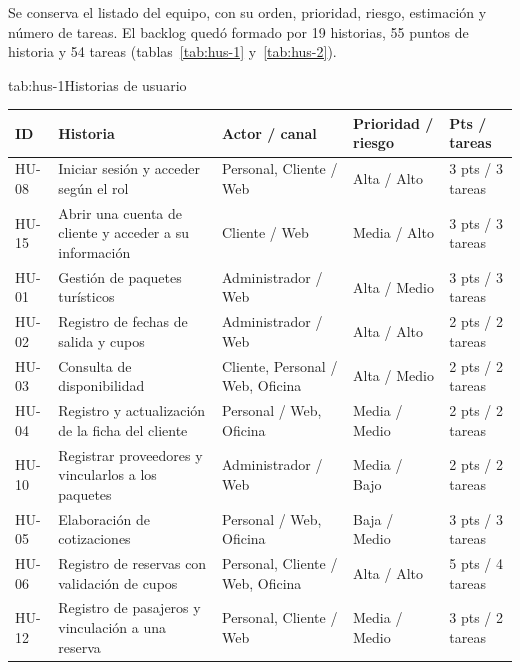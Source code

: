 Se conserva el listado del equipo, con su orden, prioridad, riesgo,
estimación y número de tareas. El backlog quedó formado por 19 historias,
55 puntos de historia y 54 tareas (tablas~\ref{tab:hus-1}
y~\ref{tab:hus-2}).

\begin{tablaapa}{tab:hus-1}{Historias de usuario}
\small
\begin{tabular}{@{}p{1.15cm}p{5.2cm}p{3.5cm}p{2.1cm}p{2.1cm}@{}}
\toprule
ID & Historia & Actor / canal & Prioridad / riesgo & Pts / tareas \\
\midrule
HU-08 & Iniciar sesión y acceder según el rol & Personal, Cliente / Web &
Alta / Alto & 3 pts / 3 tareas \\
HU-15 & Abrir una cuenta de cliente y acceder a su información & Cliente /
Web & Media / Alto & 3 pts / 3 tareas \\
HU-01 & Gestión de paquetes turísticos & Administrador / Web & Alta / Medio
& 3 pts / 3 tareas \\
HU-02 & Registro de fechas de salida y cupos & Administrador / Web & Alta /
Alto & 2 pts / 2 tareas \\
HU-03 & Consulta de disponibilidad & Cliente, Personal / Web, Oficina &
Alta / Medio & 2 pts / 2 tareas \\
HU-04 & Registro y actualización de la ficha del cliente & Personal / Web,
Oficina & Media / Medio & 2 pts / 2 tareas \\
HU-10 & Registrar proveedores y vincularlos a los paquetes & Administrador /
Web & Media / Bajo & 2 pts / 2 tareas \\
HU-05 & Elaboración de cotizaciones & Personal / Web, Oficina & Baja / Medio
& 3 pts / 3 tareas \\
HU-06 & Registro de reservas con validación de cupos & Personal, Cliente /
Web, Oficina & Alta / Alto & 5 pts / 4 tareas \\
HU-12 & Registro de pasajeros y vinculación a una reserva & Personal,
Cliente / Web & Media / Medio & 3 pts / 2 tareas \\
\bottomrule
\end{tabular}
\end{tablaapa}

